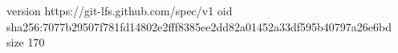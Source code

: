 version https://git-lfs.github.com/spec/v1
oid sha256:7077b29507f781fd14802e2fff8385ee2dd82a01452a33df595b40797a26e6bd
size 170
